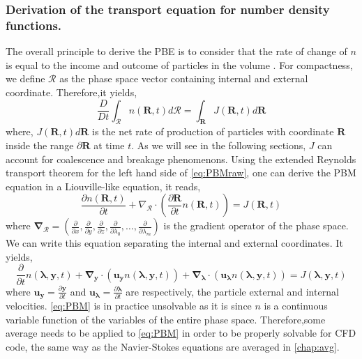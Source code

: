 \subsubsection{Derivation of the transport equation for number density functions.}
The overall principle to derive the PBE is to consider that the rate of change of $n$ is equal to the income and outcome of particles in the volume \citep{sporleder2012population}.
For compactness, we define $\mathcal{R}$ as the phase space vector containing internal and external coordinate. 
Therefore,it yields, 
\begin{equation}
    \frac{D}{Dt}\int_{\mathcal{R}} n(\mathcal{\bm{R}},t)d\mathcal{R} = \int_{\mathcal{\bm{R}}}J(\mathcal{\bm{R}},t) d\mathcal{\bm{R}}
    \label{eq:PBMraw}
\end{equation}
where, $J(\mathcal{\bm{R}},t)d\mathcal{\bm{R}}$ is the net rate of production of particles with coordinate $\mathcal{\bm{R}}$ inside the range $\partial \mathcal{\bm{R}}$ at time $t$.
As we will see in the following sections, $J$ can account for coalescence and breakage phenomenons.
Using the extended Reynolds transport theorem for the left hand side of \ref{eq:PBMraw}, one can derive the PBM equation  in a Liouville-like equation, it reads,
\begin{equation*}
    \frac{\partial n(\mathcal{\bm{R}},t)}{\partial t}  + \nabla_\mathcal{R} \cdot \left(\frac{\partial \mathcal{\bm{R}}}{\partial t} n(\mathcal{\bm{R}},t)\right) = J(\mathcal{\bm{R}},t)
\end{equation*}
where $\bm{\nabla_\mathcal{R}} = (\frac{\partial}{\partial x},\frac{\partial}{\partial y},\frac{\partial}{\partial z},\frac{\partial}{\partial \lambda_0},\ldots,\frac{\partial}{\partial \lambda_m})$ is the gradient operator of the phase space. 
We can write this equation separating the internal and external coordinates. 
It yields,
\begin{equation}
    \label{eq:PBM}
    \frac{\partial}{\partial t} n(\bm{\lambda},\bm{y},t) + \bm{\nabla_y} \cdot \left(\bm{u_y} n(\bm{\lambda},\bm{y},t)\right)+ \bm{\nabla_\lambda} \cdot \left(\bm{u_\lambda} n(\bm{\lambda},\bm{y},t)\right) = J(\bm{\lambda},\bm{y},t)
\end{equation}
where $\bm{u_y} = \frac{\partial\bm{y}}{\partial t}$ and $\bm{u_\lambda} = \frac{\partial\bm{\lambda}}{\partial t}$ are respectively, the particle external and internal velocities. 
\ref{eq:PBM} is in practice unsolvable as it is since $n$ is a continuous variable function of the variables of the entire phase space. 
Therefore,some average needs to be applied to \ref{eq:PBM} in order to be properly solvable for CFD code, the same way as the Navier-Stokes equations are averaged in \ref{chap:avg}.

